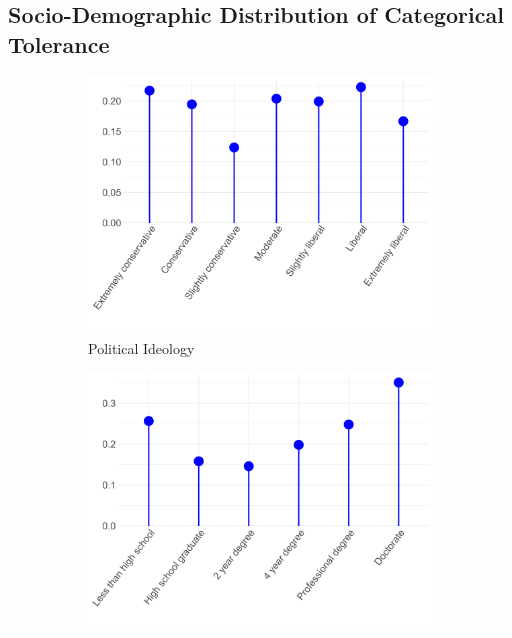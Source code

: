 \documentclass[12pt]{article}
\begin{document}
\subsection*{Socio-Demographic Distribution of Categorical Tolerance}
\begin{figure}[ht!]
    \captionsetup[subfigure]{font=footnotesize,labelfont=footnotesize}
    \centering
     \begin{subfigure}[b]{0.3\textwidth}
        \includegraphics[width=1.0\textwidth]{Plots/uni-dist-cat-tol-pol.png}
            \caption{Political Ideology}
            \label{fig:cat-tol-pol}
    \end{subfigure}
     \begin{subfigure}[b]{0.3\textwidth}
        \includegraphics[width=1.0\textwidth]{Plots/uni-dist-cat-tol-edu.png}

\end{subfigure}
\end{figure}
\end{document}
